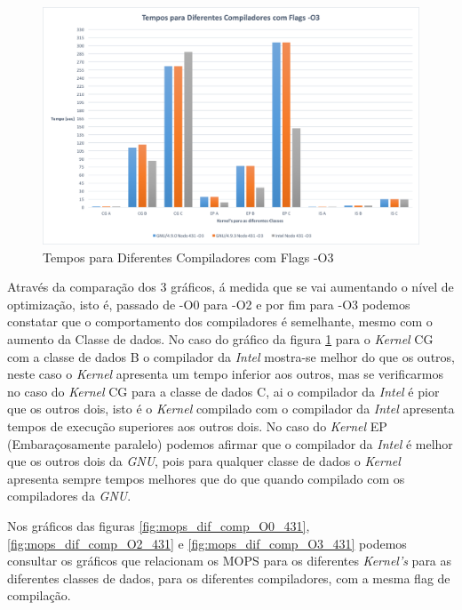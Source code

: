 \documentclass[conference,compsoc]{IEEEtran}
\begin{document}
\begin{figure}[h!]
\centering
\includegraphics[scale=0.325]{SER/tempos_dif_comp_O3_nodo_431.png}
\caption{Tempos para Diferentes Compiladores com Flags -O3}
\label{fig:tempos_dif_comp_O3_431}
\end{figure}

Através da comparação dos 3 gráficos, á medida que se vai aumentando o nível de optimização, isto é, passado de -O0 para -O2 e por fim para -O3 podemos constatar que o comportamento dos compiladores é semelhante, mesmo com o aumento da Classe de dados. No caso do gráfico da figura \ref{fig:tempos_dif_comp_O3_431} para o \textit{Kernel} CG com a classe de dados B o compilador da \textit{Intel} mostra-se melhor do que os outros, neste caso o \textit{Kernel} apresenta um tempo inferior aos outros, mas se verificarmos no caso do \textit{Kernel} CG para a classe de dados C, ai o compilador da \textit{Intel} é pior que os outros dois, isto é o \textit{Kernel} compilado com o compilador da \textit{Intel} apresenta tempos de execução superiores aos outros dois. No caso do \textit{Kernel} EP (Embaraçosamente paralelo) podemos afirmar que o compilador da \textit{Intel} é melhor que os outros dois da \textit{GNU}, pois para qualquer classe de dados o \textit{Kernel} apresenta sempre tempos melhores que do que quando compilado com os compiladores da \textit{GNU}.

Nos gráficos das figuras \ref{fig:mops_dif_comp_O0_431}, \ref{fig:mops_dif_comp_O2_431} e \ref{fig:mops_dif_comp_O3_431} podemos consultar os gráficos que relacionam os MOPS para os diferentes \textit{Kernel's} para as diferentes classes de dados, para os diferentes compiladores, com a mesma flag de compilação.
\end{document}
